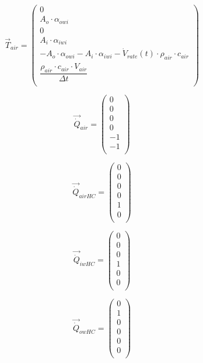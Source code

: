 \begin{equation}
\vec{T}_{air} = 
\begin{pmatrix} 
	0 \\
	A_o \cdot \alpha_{owi} \\
	0 \\
	A_i \cdot \alpha_{iwi} \\
	-A_o \cdot \alpha_{owi} - A_i \cdot \alpha_{iwi} - \dot{V}_{rate}(t) \cdot \rho_{air} \cdot c_{air}\\
	\dfrac{\rho_{air} \cdot c_{air} \cdot V_{air}}{\Delta t} \\
\end{pmatrix}
\end{equation}

\begin{equation}
\vec{\dot{Q}}_{air} = 
\begin{pmatrix} 
	0 \\
	0 \\
	0 \\
	0 \\
	-1 \\
	-1 \\
\end{pmatrix}
\end{equation}

\begin{equation}
\vec{\dot{Q}}_{airHC} = 
\begin{pmatrix} 
	0 \\
	0 \\
	0 \\
	0 \\
	1 \\
	0 \\
\end{pmatrix}
\end{equation}

\begin{equation}
\vec{\dot{Q}}_{iwHC} = 
\begin{pmatrix} 
	0 \\
	0 \\
	0 \\
	1 \\
	0 \\
	0 \\
\end{pmatrix}
\end{equation}

\begin{equation}
\vec{\dot{Q}}_{owHC} = 
\begin{pmatrix} 
	0 \\
	1 \\
	0 \\
	0 \\
	0 \\
	0 \\
\end{pmatrix}
\end{equation}

